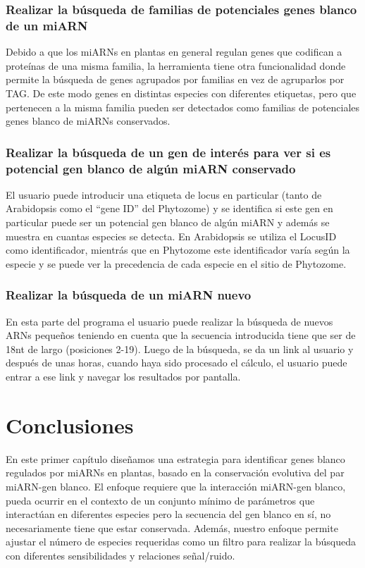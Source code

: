 \subsubsection{Realizar la búsqueda de familias de potenciales genes blanco de un miARN}
Debido a que los miARNs en plantas en general regulan genes que codifican a proteínas de una misma familia, la herramienta tiene otra funcionalidad donde permite la búsqueda de genes agrupados por familias en vez de agruparlos por TAG.
De este modo genes en distintas especies con diferentes etiquetas, pero que pertenecen a la misma familia pueden ser detectados como familias de potenciales genes blanco de miARNs conservados.

\subsubsection{Realizar la búsqueda de un gen de interés para ver si es potencial gen blanco de algún miARN conservado}

El usuario puede introducir una etiqueta de locus en particular (tanto de Arabidopsis como el ``gene ID'' del Phytozome) y se identifica si este gen en particular puede ser un potencial gen blanco de algún miARN y además se muestra en cuantas especies se detecta.
En Arabidopsis se utiliza el LocusID como identificador, mientrás que en Phytozome este identificador varía según la especie y se puede ver la precedencia de cada especie en el sitio de Phytozome.

\subsubsection{Realizar la búsqueda de un miARN nuevo}
En esta parte del programa el usuario puede realizar la búsqueda de nuevos ARNs pequeños teniendo en cuenta que la secuencia introducida tiene que ser de 18nt de largo (posiciones 2-19).
Luego de la búsqueda, se da un link al usuario y después de unas horas, cuando haya sido procesado el cálculo, el usuario puede entrar a ese link y navegar los resultados por pantalla.


\section{Conclusiones}

En este primer capítulo diseñamos una estrategia para identificar genes blanco regulados por miARNs en plantas, basado en la conservación evolutiva del par miARN-gen blanco.
El enfoque requiere que la interacción miARN-gen blanco, pueda ocurrir en el contexto de un conjunto mínimo de parámetros que interactúan en diferentes especies pero la secuencia del gen blanco en sí, no necesariamente tiene que estar conservada.
Además, nuestro enfoque permite ajustar el número de especies requeridas como un filtro para realizar la búsqueda con diferentes sensibilidades y relaciones señal/ruido.

